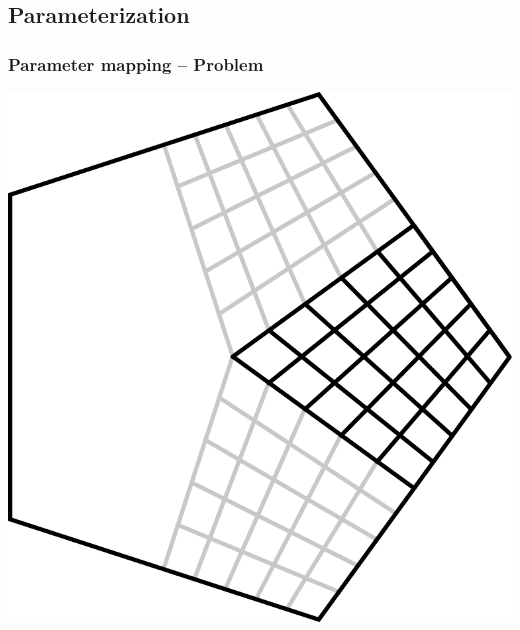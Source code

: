 \documentclass{beamer}
\begin{document}
\subsection{Parameterization}

\begin{frame}
  \frametitle{Parameter mapping -- Problem}
  \centering
  \includegraphics[width=.7\textwidth]{images/bilinear-multi.pdf}
\end{frame}
\end{document}
